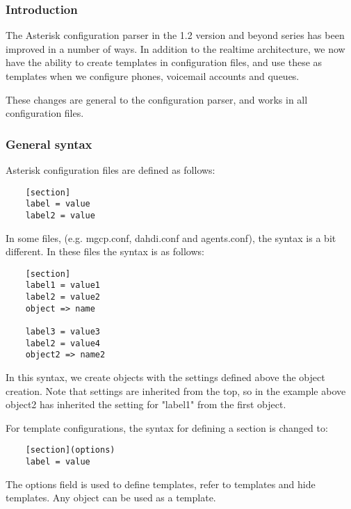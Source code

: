 \subsubsection{Introduction}

The Asterisk configuration parser in the 1.2 version
and beyond series has been improved in a number of ways. In
addition to the realtime architecture, we now have the ability to create
templates in configuration files, and use these as templates when we
configure phones, voicemail accounts and queues.

These changes are general to the configuration parser, and works in
all configuration files.

\subsubsection{General syntax}
Asterisk configuration files are defined as follows:

\begin{astlisting}
\begin{verbatim}
	[section]
	label = value
	label2 = value
\end{verbatim}
\end{astlisting}

In some files, (e.g. mgcp.conf, dahdi.conf and agents.conf), the syntax
is a bit different. In these files the syntax is as follows:
	
\begin{astlisting}
\begin{verbatim}
	[section]
	label1 = value1
	label2 = value2
	object => name

	label3 = value3
	label2 = value4
	object2 => name2
\end{verbatim}
\end{astlisting}

In this syntax, we create objects with the settings defined above the object
creation. Note that settings are inherited from the top, so in the example
above object2 has inherited the setting for "label1" from the first object.

For template configurations, the syntax for defining a section is changed
to:
\begin{astlisting}
\begin{verbatim}
	[section](options)
	label = value
\end{verbatim}
\end{astlisting}

The options field is used to define templates, refer to templates and hide
templates. Any object can be used as a template.

